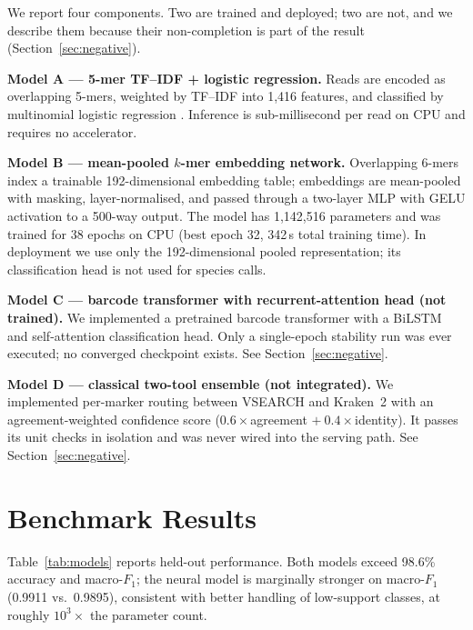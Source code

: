\documentclass[conference]{IEEEtran}
\begin{document}
We report four components. Two are trained and deployed; two are not, and we
describe them because their non-completion is part of the result
(Section~\ref{sec:negative}).

\textbf{Model A --- 5-mer TF--IDF + logistic regression.} Reads are encoded
as overlapping 5-mers, weighted by TF--IDF into 1{,}416 features, and
classified by multinomial logistic regression \cite{sklearn}. Inference is
sub-millisecond per read on CPU and requires no accelerator.

\textbf{Model B --- mean-pooled $k$-mer embedding network.} Overlapping
6-mers index a trainable 192-dimensional embedding table; embeddings are
mean-pooled with masking, layer-normalised, and passed through a two-layer
MLP with GELU activation to a 500-way output. The model has 1{,}142{,}516
parameters and was trained for 38 epochs on CPU (best epoch 32, 342\,s total
training time). In deployment we use only the 192-dimensional pooled
representation; its classification head is not used for species calls.

\textbf{Model C --- barcode transformer with recurrent-attention head
(not trained).} We implemented a pretrained barcode transformer
\cite{barcodebert} with a BiLSTM and self-attention classification head.
Only a single-epoch stability run was ever executed; no converged
checkpoint exists. See Section~\ref{sec:negative}.

\textbf{Model D --- classical two-tool ensemble (not integrated).} We
implemented per-marker routing between VSEARCH \cite{vsearch} and Kraken~2
\cite{kraken2} with an agreement-weighted confidence score
($0.6\times$agreement $+\ 0.4\times$identity). It passes its unit checks in
isolation and was never wired into the serving path. See
Section~\ref{sec:negative}.

\section{Benchmark Results}
\label{sec:benchmark}

Table~\ref{tab:models} reports held-out performance. Both models exceed
98.6\% accuracy and macro-$F_1$; the neural model is marginally stronger on
macro-$F_1$ (0.9911 vs.\ 0.9895), consistent with better handling of
low-support classes, at roughly $10^3\times$ the parameter count.
\end{document}
